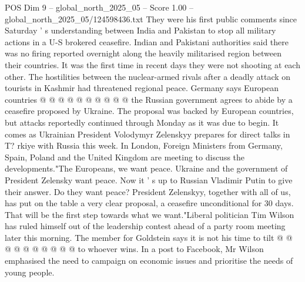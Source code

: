 \begin{textsample}{POS Dim 9 – global\_north\_2025\_05 – Score 1.00 – global\_north\_2025\_05/124598436.txt}
They were his first public comments since Saturday ' s understanding between India and Pakistan to stop all military actions in a U-S brokered ceasefire.
Indian and Pakistani authorities said there was no firing reported overnight along the heavily militarised region between their countries.
It was the first time in recent days they were not shooting at each other.
The hostilities between the nuclear-armed rivals after a deadly attack on tourists in Kashmir had threatened regional peace.
Germany says European countries @ @ @ @ @ @ @ @ @ @ the Russian government agrees to abide by a ceasefire proposed by Ukraine.
The proposal was backed by European countries, but attacks reportedly continued through Monday as it was due to begin.
It comes as Ukrainian President Volodymyr Zelenskyy prepares for direct talks in T? rkiye with Russia this week.
In London, Foreign Ministers from Germany, Spain, Poland and the United Kingdom are meeting to discuss the developments."The Europeans, we want peace.
Ukraine and the government of President Zelensky want peace.
Now it ' s up to Russian Vladimir Putin to give their answer.
Do they want peace?
President Zelenskyy, together with all of us, has put on the table a very clear proposal, a ceasefire unconditional for 30 days.
That will be the first step towards what we want."Liberal politician Tim Wilson has ruled himself out of the leadership contest ahead of a party room meeting later this morning.
The member for Goldstein says it is not his time to tilt @ @ @ @ @ @ @ @ @ @ to whoever wins.
In a post to Facebook, Mr Wilson emphasised the need to campaign on economic issues and prioritise the needs of young people.

\end{textsample}
